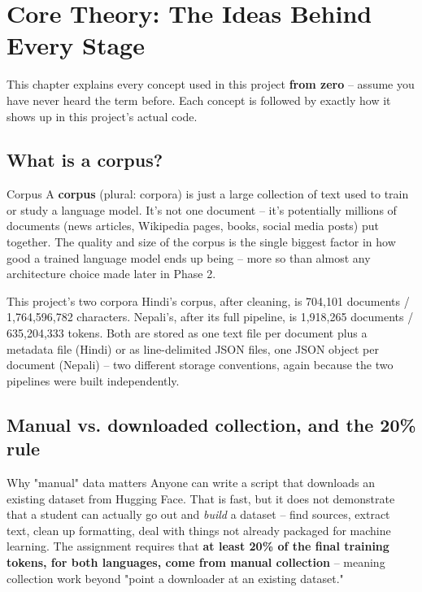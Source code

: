 \documentclass[11pt]{report}
\begin{document}
\chapter{Core Theory: The Ideas Behind Every Stage}

This chapter explains every concept used in this project \textbf{from
zero} -- assume you have never heard the term before. Each concept is
followed by exactly how it shows up in this project's actual code.

\section{What is a corpus?}

\begin{concept}{Corpus}
A \textbf{corpus} (plural: corpora) is just a large collection of text
used to train or study a language model. It's not one document -- it's
potentially millions of documents (news articles, Wikipedia pages,
books, social media posts) put together. The quality and size of the
corpus is the single biggest factor in how good a trained language
model ends up being -- more so than almost any architecture choice made
later in Phase 2.
\end{concept}

\begin{implementation}{This project's two corpora}
Hindi's corpus, after cleaning, is 704,101 documents / 1,764,596,782
characters. Nepali's, after its full pipeline, is 1,918,265 documents /
635,204,333 tokens. Both are stored as one text file per document plus a
metadata file (Hindi) or as line-delimited JSON files, one JSON object
per document (Nepali) -- two different storage conventions, again
because the two pipelines were built independently.
\end{implementation}

\section{Manual vs. downloaded collection, and the 20\% rule}

\begin{concept}{Why "manual" data matters}
Anyone can write a script that downloads an existing dataset from Hugging
Face. That is fast, but it does not demonstrate that a student can
actually go out and \textit{build} a dataset -- find sources, extract
text, clean up formatting, deal with things not already packaged for
machine learning. The assignment requires that \textbf{at least 20\% of
the final training tokens, for both languages, come from manual
collection} -- meaning collection work beyond "point a downloader at an
existing dataset."
\end{concept}
\end{document}
